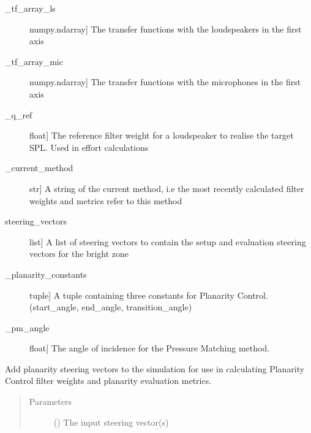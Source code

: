 \documentclass[letterpaper,10pt,english]{sphinxmanual}
\begin{document}
\begin{fulllineitems}
\begin{description}
\item[{\_tf\_array\_ls}] \leavevmode{[}numpy.ndarray{]}
The transfer functions with the loudspeakers in the first axis

\item[{\_tf\_array\_mic}] \leavevmode{[}numpy.ndarray{]}
The transfer functions with the microphones in the first axis

\item[{\_q\_ref}] \leavevmode{[}float{]}
The reference filter weight for a loudspeaker to realise the target SPL. Used in effort calculations

\item[{\_current\_method}] \leavevmode{[}str{]}
A string of the current method, i.e the most recently calculated filter weights and metrics refer to this method

\item[{steering\_vectors}] \leavevmode{[}list{]}
A list of steering vectors to contain the setup and evaluation steering vectors for the bright zone

\item[{\_planarity\_constants}] \leavevmode{[}tuple{]}
A tuple containing three constants for Planarity Control. (start\_angle, end\_angle, transition\_angle)

\item[{\_pm\_angle}] \leavevmode{[}float{]}
The angle of incidence for the Pressure Matching method.

\end{description}

\begin{fulllineitems}
\label{\detokenize{source/pyzones:pyzones.Simulation.add_steering_vectors}}
Add planarity steering vectors to the simulation for use in calculating Planarity Control filter weights and
planarity evaluation metrics.
\begin{quote}\begin{description}
\item[{Parameters}] \leavevmode
{} () \textendash{} The input steering vector(s)

\end{description}\end{quote}


\end{fulllineitems}
\end{fulllineitems}
\end{document}
